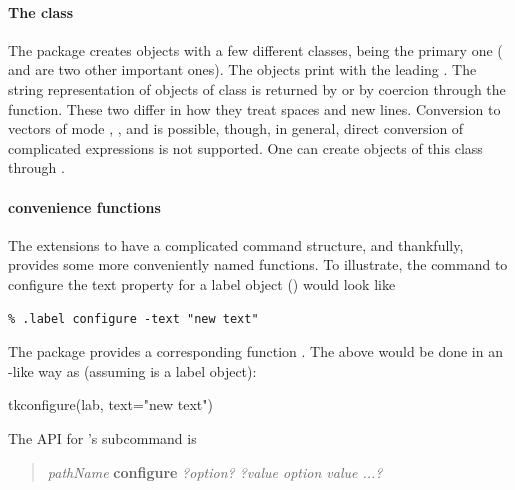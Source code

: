 \paragraph{The  class}
The  package creates objects with a few different classes,
 being the primary one ( and 
are two other important ones).  The  objects print with
the leading . The string representation of objects of
class  is returned by  or by coercion
through the  function. These two differ in how
they treat spaces and new lines.  Conversion to vectors of mode
, ,  and 
is possible, though, in general, direct conversion of complicated
\TCL\/ expressions is not supported. One can create objects of this
class through .



\paragraph{ convenience functions}
The \TK\/ extensions to \TCL\/ have a complicated command structure,
and thankfully,  provides some more conveniently named
functions. To illustrate, the \TCL\/ command to configure the text property for
a label object () would look like
\begin{verbatim}
% .label configure -text "new text"
\end{verbatim}
The  package provides a corresponding function
. The above would be done in an \R-like way as (assuming  is a
label object):


\begin{Schunk}
\begin{Sinput}
 tkconfigure(lab, text="new text")
\end{Sinput}
\end{Schunk}




The \TK\/ API for 's  subcommand is

\begin{quotation}
  \textit{pathName} \textbf{configure} \textit{?option? ?value option value ...?}
\end{quotation}

